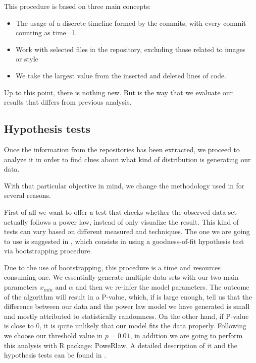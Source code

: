 \documentclass[conference]{IEEEtran}
\begin{document}
This procedure is based on three main concepts:
\begin{itemize}
\item The usage of a discrete timeline formed by the commits, with
  every commit counting as time=1.
\item Work with selected files in the repository, excluding those
  related to images or style
\item We take the largest value from the inserted and deleted lines of
  code.
\end{itemize}

Up to this point, there is nothing new. But is the way that we
evaluate our results that differs from previous analysis.

\subsection{Hypothesis tests}

Once the information from the repositories has been extracted, we
proceed to analyze it in order to find clues about what kind of
distribution is generating our data.

With that particular objective in mind, we change the methodology used
in \cite{merelo2017self} for several reasons.

First of all we want to offer a test that checks whether the observed
data set actually follows a power law, instead of only visualize the
result.  This kind of tests can vary based on different measured and
techniques. The one we are going to use is suggested in
\cite{clauset2009power}, which consists in using a goodness-of-fit
hypothesis test via bootstrapping procedure.

Due to the use of bootstrapping, this procedure is a time and
resources consuming one.  We essentially generate multiple data sets
with our two main parameters $x_{min}$ and $\alpha$ and then we
re-infer the model parameters. The outcome of the algorithm will
result in a P-value, which, if is large enough, tell us that the
difference between our data and the power law model we have generated
is small and mostly attributed to statistically randomness. On the
other hand, if P-value is close to 0, it is quite unlikely that our
model fits the data properly.  Following \cite{clauset2009power} we
choose our threshold value in $p=0.01$, in addition we are going to
perform this analysis with R package: PoweRlaw. A detailed description
of it and the hypothesis tests can be found in
\cite{gillespie2015power}.
\end{document}

